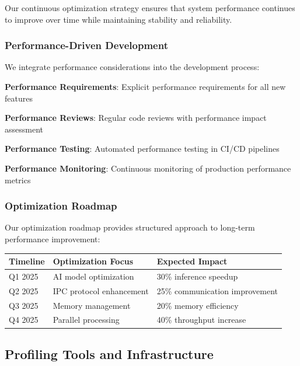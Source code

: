Our continuous optimization strategy ensures that system performance continues to improve over time while maintaining stability and reliability.

\subsubsection*{Performance-Driven Development}

We integrate performance considerations into the development process:

\begin{compactlist}
    \item \textbf{Performance Requirements}: Explicit performance requirements for all new features
    \item \textbf{Performance Reviews}: Regular code reviews with performance impact assessment
    \item \textbf{Performance Testing}: Automated performance testing in CI/CD pipelines
    \item \textbf{Performance Monitoring}: Continuous monitoring of production performance metrics
\end{compactlist}

\subsubsection*{Optimization Roadmap}

Our optimization roadmap provides structured approach to long-term performance improvement:

\begin{center}
\begin{tabular}{@{}lll@{}}
\toprule
\textbf{Timeline} & \textbf{Optimization Focus} & \textbf{Expected Impact} \\
\midrule
Q1 2025 & AI model optimization & 30\% inference speedup \\
Q2 2025 & IPC protocol enhancement & 25\% communication improvement \\
Q3 2025 & Memory management & 20\% memory efficiency \\
Q4 2025 & Parallel processing & 40\% throughput increase \\
\bottomrule
\end{tabular}
\end{center}

\subsection*{Profiling Tools and Infrastructure}

